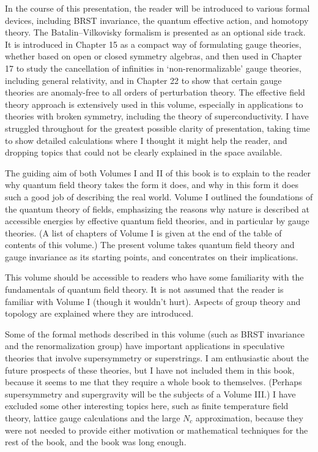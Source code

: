 In the course of this presentation, the reader will be introduced to various
formal devices, including BRST invariance, the quantum effective action, and
homotopy theory. The Batalin--Vilkovisky formalism is presented as an optional
side track. It is introduced in Chapter 15 as a compact way of formulating gauge
theories, whether based on open or closed symmetry algebras, and then used in
Chapter 17 to study the cancellation of infinities in `non-renormalizable'
gauge theories, including general relativity, and in Chapter 22 to show that
certain gauge theories are anomaly-free to all orders of perturbation theory.
The effective field theory approach is extensively used in this volume,
especially in applications to theories with broken symmetry, including the
theory of superconductivity. I have struggled throughout for the greatest
possible clarity of presentation, taking time to show detailed calculations
where I thought it might help the reader, and dropping topics that could not be
clearly explained in the space available.

The guiding aim of both Volumes I and II of this book is to explain to the
reader why quantum field theory takes the form it does, and why in this form it
does such a good job of describing the real world. Volume I outlined the
foundations of the quantum theory of fields, emphasizing the reasons why nature
is described at accessible energies by effective quantum field theories, and in
particular by gauge theories. (A list of chapters of Volume I is given at the
end of the table of contents of this volume.) The present volume takes quantum
field theory and gauge invariance as its starting points, and concentrates on
their implications.

This volume should be accessible to readers who have some familiarity with the
fundamentals of quantum field theory. It is not assumed that the reader is
familiar with Volume I (though it wouldn't hurt). Aspects of group theory and
topology are explained where they are introduced.

Some of the formal methods described in this volume (such as BRST invariance
and the renormalization group) have important applications in speculative
theories that involve supersymmetry or superstrings. I am enthusiastic about
the future prospects of these theories, but I have not included them in this
book, because it seems to me that they require a whole book to themselves.
(Perhaps supersymmetry and supergravity will be the subjects of a Volume III.)
I have excluded some other interesting topics here, such as finite temperature
field theory, lattice gauge calculations and the large $N_c$ approximation,
because they were not needed to provide either motivation or mathematical
techniques for the rest of the book, and the book was long enough.

